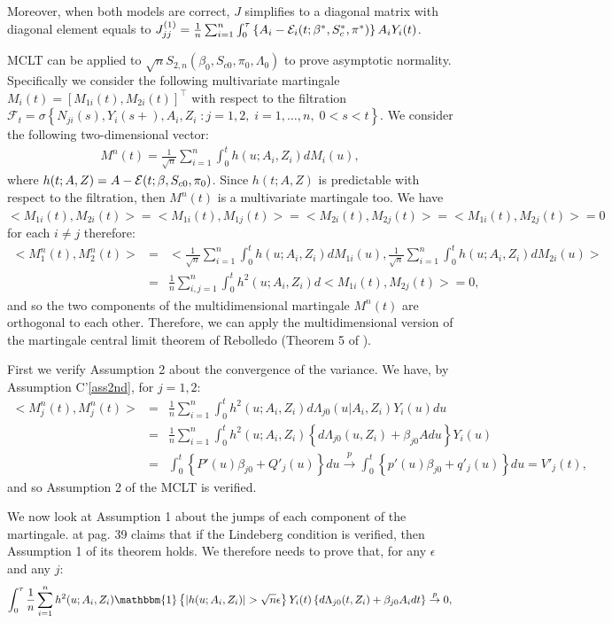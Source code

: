 \documentclass[11pt]{article}
\newcommand{\eqnn}{\begin{eqnarray*}}
\newcommand{\een}{\end{eqnarray*}}
\begin{document}
Moreover, when both models are correct, $J$ simplifies to a diagonal matrix with diagonal element equals to $J^{(1)}_{jj}=\frac{1}{n}\sum_{i=1}^n\int_0^\tau  \left\{A_i-{\cal E}_i(t; {\beta}^{*}, S^{*}_c,\pi^{*})\right\}A_iY_i(t)$.

MCLT can be applied to $\sqrt{n}S_{2,n}({\beta}_0, S_{c0},  \pi_0, \Lambda_0)$ to prove asymptotic normality. Specifically we consider the following multivariate martingale 
${M}_i(t)=[
           M_{1i}(t) ,
           M_{2i}(t)
      ]^\top $
with respect to the filtration $\mathcal{F}_t=\sigma\left\{N_{ji}(s), Y_i(s+), A_i, Z_i\;:j=1,2,\;i=1,\ldots,n,\;0<s<t\right\}$.
We consider the following two-dimensional vector:
\eqnn
{M}^n(t)=\frac{1}{\sqrt{n}} \sum_{i=1}^n\int_0^t h(u; A_i,Z_i) d{M}_i(u),
\een
where $h(t; A,Z)= A -{\cal E}(t; \beta, S_{c0},\pi_0)$.
Since $h(t; A,Z)$ is predictable with respect to the filtration, then ${M}^n(t)$ is a multivariate martingale too.
We have $<M_{1i}(t),M_{2i}(t)>=<M_{1i}(t),M_{1j}(t)>=<M_{2i}(t),M_{2j}(t)>=<M_{1i}(t),M_{2j}(t)>=0$ for each $i\neq j$ therefore:
\eqnn
<{M}_1^n(t),{M}_2^n(t)>&=&<\frac{1}{\sqrt{n}} \sum_{i=1}^n\int_0^t h(u; A_i,Z_i) d{M}_{1i}(u),\frac{1}{\sqrt{n}} \sum_{i=1}^n\int_0^t h(u; A_i,Z_i) d{M}_{2i}(u)>\\&=&\frac{1}{n} \sum_{i,j=1}^n\int_0^t h^2(u; A_i,Z_i) d<M_{1i}(t),M_{2j}(t)>=0,
\een
and so the two components of the multidimensional martingale ${M}^n(t)$ are orthogonal to each other.
Therefore, we can apply the multidimensional version of the martingale central limit theorem of Rebolledo (Theorem 5 of \cite{rebolledo1978applications}). 

First we verify Assumption 2 about the convergence of the variance.
We have, by Assumption C'\ref{ass2nd}, for $j=1,2$:
\eqnn
<{M}_j^n(t),{M}_j^n(t)>&=&\frac{1}{n}\sum_{i=1}^n\int_0^t h^2(u; A_i,Z_i) d\Lambda_{j0}(u | A_i, Z_i)Y_i(u)du\\
&=&\frac{1}{n}\sum_{i=1}^n\int_0^t h^2(u; A_i,Z_i) \left\{d\Lambda_{j0}(u,Z_i) + \beta_{j0}Adu\right\}Y_i(u)\\
&=&\int_0^t  \left\{P'(u)\beta_{j0}+Q'_j(u)\right\}du\overset{p}{\rightarrow} \int_0^t  \left\{p'(u)\beta_{j0}+q'_j(u)\right\}du=V'_j(t),
\een
and so Assumption 2 of the MCLT is verified.

We now look at Assumption 1 about the jumps of each component of the martingale. \cite{rebolledo1978applications} at pag. 39 claims that if the Lindeberg condition is verified, then Assumption 1 of its theorem holds.
We therefore needs to prove that, for any $\epsilon$ and any $j$:
\eqnn
\int_0^\tau \frac{1}{n}\sum_{i=1}^n h^2(u ; A_i,Z_i) \mathbbm{1}\left\{\left|h(u ; A_i,Z_i)\right|>\sqrt{n}\epsilon\right\}Y_i(t)\left\{d\Lambda_{j0}(t, Z_i) + \beta_{j0} A_idt\right\} \overset{p}{\rightarrow} 0,
\een
\end{document}
